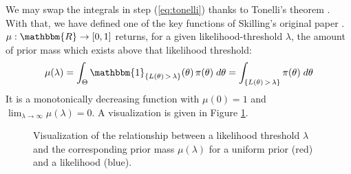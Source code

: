 \documentclass[12pt, a4paper]{report}
\begin{document}
We may swap the integrals in step (\ref{eq:tonelli}) thanks to Tonelli's theorem \cite[147]{measure_theory}.
With that, we have defined one of the key functions of Skilling's original paper \cite{skilling}.
$\mu: \mathbbm{R} \rightarrow [0,1]$ returns, for a given likelihood-threshold $\lambda$, the amount of prior mass which exists above that likelihood threshold:
\begin{align}
\mu(\lambda) 
= \int_\Theta \mathbbm{1}_{\{ L(\theta) \, > \, \lambda \}}(\theta) \, \pi(\theta) \; d\theta
= \int_{\{L(\theta) \,>\, \lambda\}} \pi(\theta) \; d\theta \label{eq:mu_definition}
\end{align}
It is a monotonically decreasing function with $\mu(0) = 1$ and $\lim_{\lambda \rightarrow \infty} \mu(\lambda) = 0$.
A visualization is given in Figure \ref{fig:xlambda}.

\begin{figure}
    \centering
    \caption{Visualization of the relationship between a likelihood threshold $\lambda$ and the corresponding prior mass $\mu(\lambda)$ for a uniform prior (red) and a likelihood (blue).}
    \label{fig:xlambda}
\end{figure}
\end{document}

